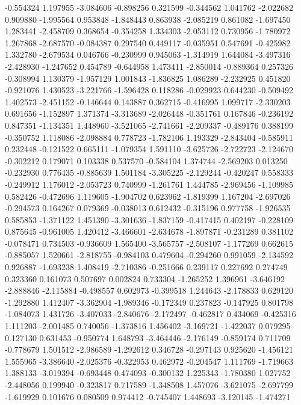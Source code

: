 -0.554324
1.197955
-3.084606
-0.898256
0.321599
-0.344562
1.041762
-2.022682
0.909880
-1.995564
0.953848
-1.848443
0.863938
-2.085219
0.861082
-1.697450
1.283441
-2.458709
0.368654
-0.354258
1.334303
-2.053112
0.730956
-1.780972
1.267868
-2.687570
-0.084387
0.297540
0.449117
-0.035951
0.547691
-0.425982
1.332780
-2.679534
0.046766
-0.230999
0.945063
-1.314919
1.644084
-3.497316
-2.428930
-1.247652
0.454789
-0.644958
1.473411
-2.850014
-0.889364
0.257326
-0.308994
1.130379
-1.957129
1.001843
-1.836825
1.086289
-2.232925
0.451820
-0.921076
1.430523
-3.221766
-1.596428
0.118286
-0.029923
0.644230
-0.509492
1.402573
-2.451152
-0.146644
0.143887
0.362715
-0.416995
1.099717
-2.330203
0.691656
-1.152897
1.371374
-3.313689
-2.026448
-0.351761
0.167846
-0.236192
0.847351
-1.134351
1.448960
-3.521065
-2.741661
-2.209337
-0.489176
0.388199
-0.350752
1.118086
-2.098884
0.778723
-1.782106
1.193329
-2.843404
-0.585911
0.232448
-0.121522
0.665111
-1.079354
1.591110
-3.625726
-2.722723
-2.124670
-0.302212
0.179071
0.103338
0.537570
-0.584104
1.374744
-2.569203
0.013250
-0.232930
0.776435
-0.885639
1.501184
-3.305225
-2.129244
-0.420247
0.558333
-0.249912
1.176012
-2.053723
0.740999
-1.261761
1.444785
-2.969456
-1.109985
0.582426
-0.472696
1.119605
-1.904702
0.623962
-1.819399
1.167204
-2.697026
-0.294573
0.164267
0.079369
-0.038013
0.612432
-0.315196
0.977758
-1.926535
0.585853
-1.371122
1.451390
-3.301636
-1.837159
-0.417415
0.402197
-0.228109
0.875645
-0.961005
1.420412
-3.466601
-2.634678
-1.897871
-0.231289
0.381102
-0.078471
0.734503
-0.936609
1.565400
-3.565757
-2.508107
-1.177269
0.662615
-0.885057
1.520661
-2.818755
-0.984103
0.479604
-0.294260
0.991059
-2.134592
0.926887
-1.693238
1.408419
-2.710386
-0.251666
0.239117
0.227692
0.274749
0.323360
0.161073
0.507697
0.002824
0.733304
-1.265252
1.396961
-3.646192
-2.888846
-2.115884
-0.498557
0.602973
-0.399518
1.244643
-2.178833
0.629120
-1.292880
1.412407
-3.362904
-1.989346
-0.172349
0.237823
-0.147925
0.801798
-1.084073
1.431726
-3.407033
-2.840676
-2.172497
-0.462817
0.434069
-0.425316
1.111203
-2.001485
0.740056
-1.373816
1.456402
-3.169721
-1.422037
0.079295
0.127130
0.631453
-0.950774
1.648793
-3.464446
-2.176149
-0.859174
0.711709
-0.778679
1.501512
-2.986589
-1.292612
0.346728
-0.297143
0.925620
-1.456121
1.555965
-3.386640
-2.025376
-0.322953
0.462972
-0.204547
1.111769
-1.719663
1.388133
-3.019394
-0.693448
0.474093
-0.300132
1.225343
-1.780380
1.027752
-2.448056
0.199940
-0.323817
0.717589
-1.348508
1.457076
-3.621075
-2.697799
-1.619929
0.101676
0.080509
0.974412
-0.745407
1.448693
-3.120145
-1.474271
